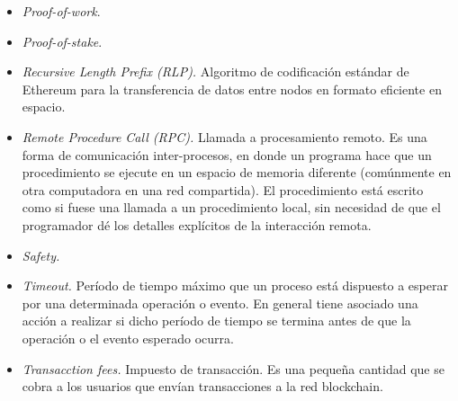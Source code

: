 \begin{itemize}
     \item \textit{Proof-of-work}.
     \item \textit{Proof-of-stake}.
     \item \textit{Recursive Length Prefix (RLP).} Algoritmo de codificación estándar de Ethereum para la transferencia de datos
     entre nodos en formato eficiente en espacio.
     \item \textit{Remote Procedure Call (RPC).} Llamada a procesamiento remoto. Es una forma de comunicación inter-procesos,
     en donde un programa hace que un procedimiento se ejecute en un espacio de memoria diferente (comúnmente en otra computadora
     en una red compartida). El procedimiento  está escrito como si fuese una llamada a un procedimiento local, sin necesidad de
     que el programador dé los detalles explícitos de la interacción remota.
     \item \textit{Safety.}
     \item \textit{Timeout.} Período de tiempo máximo que un proceso está dispuesto a esperar por una determinada
     operación o evento. En general tiene asociado una acción a realizar si dicho período de tiempo se termina antes
     de que la operación o el evento esperado ocurra.
     \item \textit{Transacction fees.} Impuesto de transacción. Es una pequeña cantidad que se cobra a los
     usuarios que envían transacciones a la red blockchain.  
\end{itemize}
